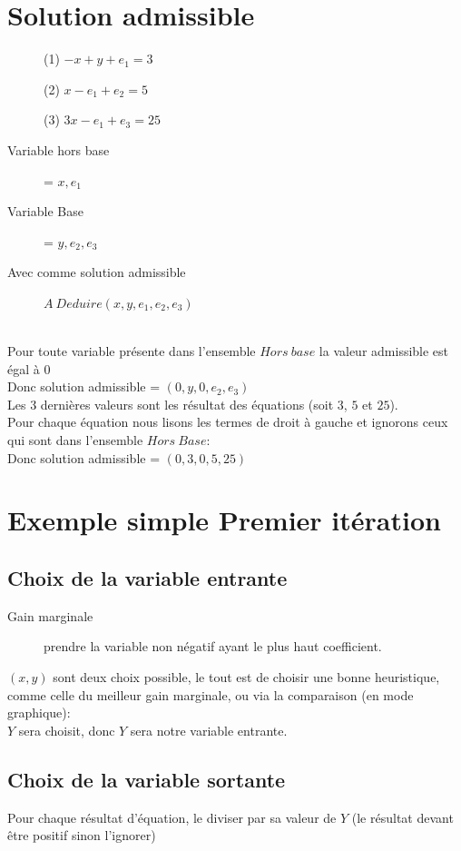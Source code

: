 \section{Solution admissible}
\begin{description}
\item[] (1) $-x + y + e_1 = 3$
\item[] (2) $x - e_1 + e_2 = 5$
\item[] (3) $3x - e_1 + e_3 = 25$
\item[Variable hors base] = $x,e_1$
\item[Variable Base] = $y,e_2,e_3$
\item[Avec comme solution admissible] $A\ Deduire (x,y,e_1,e_2,e_3)$
\end{description}
\ \\
Pour toute variable présente dans l'ensemble $Hors\ base$ la valeur admissible est égal à $0$\\
Donc solution admissible = $(0, y, 0, e_2, e_3)$\\
Les 3 dernières valeurs sont les résultat des équations (soit $3$, $5$ et $25$).\\
Pour chaque équation nous lisons les termes de droit à gauche et ignorons ceux qui sont dans l'ensemble $Hors\ Base$:\\
Donc solution admissible = $(0, 3, 0, 5, 25)$\\

\section{Exemple simple Premier itération}
\subsection{Choix de la variable entrante}
\begin{description}
\item[Gain marginale] prendre la variable non négatif ayant le plus haut coefficient.
\end{description}
$(x,y)$ sont deux choix possible, le tout est de choisir une bonne heuristique, comme celle du meilleur gain marginale, ou via la comparaison (en mode graphique):\\
$Y$ sera choisit, donc $Y$ sera notre variable entrante.\\

\subsection{Choix de la variable sortante}
Pour chaque résultat d'équation, le diviser par sa valeur de $Y$ (le résultat devant être positif sinon l'ignorer)\\

